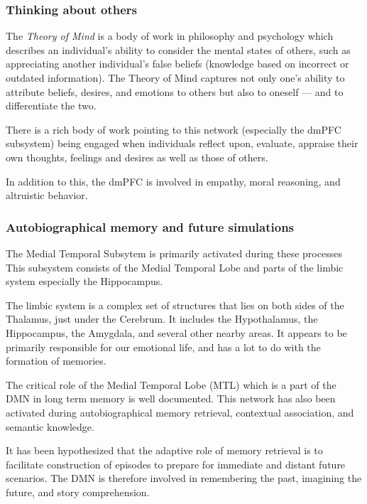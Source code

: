 \documentclass[a4paper, amsfonts, amssymb, amsmath, reprint, showkeys, nofootinbib, twoside]{revtex4-1}
\begin{document}
\subsubsection{Thinking about others}

The \textit{Theory of Mind} is a body of work in philosophy and psychology which
describes an individual's ability to consider the mental states of others, such as
appreciating another individual's false beliefs (knowledge based on incorrect or
outdated information). The Theory of Mind captures not only one's ability to
attribute beliefs, desires, and emotions to others but also to oneself --- and to
differentiate the two. \cite{autistictheoryofmind}

There is a rich body of work pointing to this network (especially the dmPFC subsystem) 
being engaged when individuals reflect upon, evaluate, appraise their own thoughts, 
feelings and desires as well as those of others. \cite{theoryofmind}

In addition to this, the dmPFC is involved in empathy, moral reasoning,
and altruistic behavior. \cite{defaultnetworkadaptive,dmpfcothers,dmpfcaltruism}

\subsubsection{Autobiographical memory and future simulations}

The Medial Temporal Subsytem is primarily activated during these processes
This subsystem consists of the Medial Temporal Lobe and parts of the limbic system
especially the Hippocampus.

The limbic system is a complex set of structures that lies on both sides of the
Thalamus, just under the Cerebrum. It includes the Hypothalamus, the Hippocampus, the
Amygdala, and several other nearby areas. It appears to be primarily responsible for
our emotional life, and has a lot to do with the formation of memories. \cite{limbic}

The critical role of the Medial Temporal Lobe (MTL) which is a part of the DMN 
in long term memory is well documented. \cite{mtl}
This network has also been activated during autobiographical memory retrieval, 
contextual association, and semantic knowledge. \cite{defaultnetworkadaptive}

It has been hypothesized that the adaptive role of memory retrieval is to facilitate 
construction of episodes to prepare for immediate and distant future scenarios. \cite{defaultnetworkadaptive}
The DMN is therefore involved in remembering the past, imagining the future, and story
comprehension. \cite{defaultnetworkadaptive}
\end{document}
